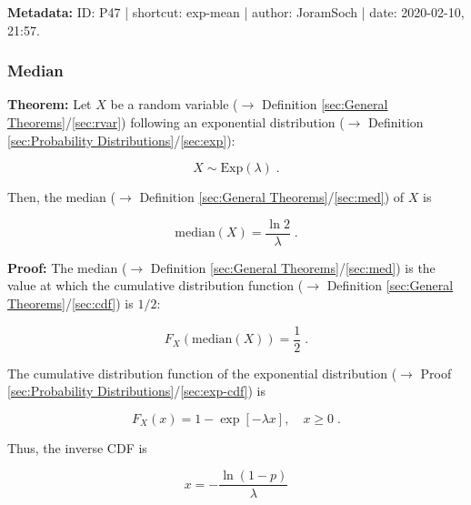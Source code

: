\documentclass[a4paper,12pt,twoside]{book}
\begin{document}
\vspace{1em}
\textbf{Metadata:} ID: P47 | shortcut: exp-mean | author: JoramSoch | date: 2020-02-10, 21:57.
\vspace{1em}



\subsubsection[\textbf{Median}]{Median} \label{sec:exp-med}
\setcounter{equation}{0}

\textbf{Theorem:} Let $X$ be a random variable ($\rightarrow$ Definition \ref{sec:General Theorems}/\ref{sec:rvar}) following an exponential distribution ($\rightarrow$ Definition \ref{sec:Probability Distributions}/\ref{sec:exp}):

\begin{equation} \label{eq:exp-med-exp}
X \sim \mathrm{Exp}(\lambda) \; .
\end{equation}

Then, the median ($\rightarrow$ Definition \ref{sec:General Theorems}/\ref{sec:med}) of $X$ is

\begin{equation} \label{eq:exp-med-exp-med}
\mathrm{median}(X) = \frac{\ln 2}{\lambda} \; .
\end{equation}


\vspace{1em}
\textbf{Proof:} The median ($\rightarrow$ Definition \ref{sec:General Theorems}/\ref{sec:med}) is the value at which the cumulative distribution function ($\rightarrow$ Definition \ref{sec:General Theorems}/\ref{sec:cdf}) is $1/2$:

\begin{equation} \label{eq:exp-med-median}
F_X(\mathrm{median}(X)) = \frac{1}{2} \; .
\end{equation}

The cumulative distribution function of the exponential distribution ($\rightarrow$ Proof \ref{sec:Probability Distributions}/\ref{sec:exp-cdf}) is

\begin{equation} \label{eq:exp-med-exp-cdf}
F_X(x) = 1 - \exp[-\lambda x], \quad x \geq 0 \; .
\end{equation}

Thus, the inverse CDF is

\begin{equation} \label{eq:exp-med-exp-cdf-inv}
x = -\frac{\ln(1-p)}{\lambda}
\end{equation}
\end{document}
